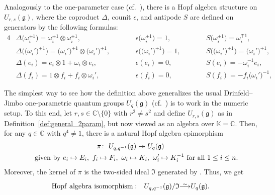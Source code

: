 \documentclass[pdftex]{sigma}
\numberwithin{equation}{section}
\newcommand{\fg}{\mathfrak{g}}
\newcommand{\BC}{\mathbb{C}}
\newcommand\iso{ \vphantom{j^{X^2}}\smash{\overset{\sim}{\vphantom{\rule{0pt}{0.20em}}\smash{\longrightarrow}}} }
\begin{document}
Analogously to the one-parameter case (cf.\ \cite[Section~4.11]{J}), there is a Hopf algebra structure on $U_{r,s}(\fg)$, where the coproduct $\Delta$, counit $\epsilon$, and antipode $S$ are defined on generators by the following formulas:
\begin{alignat*}{4}
 &\Delta\bigl(\omega_{i}^{\pm 1}\bigr) = \omega_{i}^{\pm 1} \otimes \omega_{i}^{\pm 1}, \qquad&&
 \epsilon\bigl(\omega_{i}^{\pm 1}\bigr) = 1, \qquad&&
 S\bigl(\omega_{i}^{\pm 1}\bigr) = \omega_{i}^{\mp 1},& \\
 &\Delta\bigl(\bigl(\omega_{i}'\bigr)^{\pm 1}\bigr) = \bigl(\omega_{i}'\bigr)^{\pm 1} \otimes \bigl(\omega_{i}'\bigr)^{\pm 1},\qquad&&
 \epsilon\bigl(\bigl(\omega_{i}'\bigr)^{\pm 1}\bigr) = 1,\qquad&&
 S\bigl(\bigl(\omega_{i}'\bigr)^{\pm 1}\bigr) = \bigl(\omega_{i}'\bigr)^{\mp 1},& \\
 &\Delta(e_{i}) = e_{i} \otimes 1 + \omega_{i} \otimes e_{i},\qquad&&
 \epsilon(e_{i}) = 0,\qquad&&
 S(e_{i}) = -\omega_{i}^{-1}e_{i} ,&\\
 &\Delta(f_{i}) = 1 \otimes f_{i} + f_{i} \otimes \omega_{i}',\qquad&&
 \epsilon(f_{i}) = 0,\qquad&&
 S(f_{i}) = -f_{i}\bigl(\omega_{i}'\bigr)^{-1},&
\end{alignat*}

\begin{Remark}%
The simplest way to see how the definition above generalizes the usual Drinfeld--Jimbo one-parametric quantum groups $U_q(\fg)$ (cf.\ \cite[Section~4]{J}) is to work in the numeric setup. To this end, let $r,s\in \BC\setminus \{0\}$ with $r^{2}\neq s^{2}$ and define $U_{r,s}(\fg)$ as in Definition~\ref{def:general_2param}, but now viewed as an algebra over $\mathbb{K}=\BC$. Then, for any $q\in \mathbb{C}$ with $q^{4} \neq 1$, there is a natural Hopf algebra epimorphism
\begin{gather*}
 \pi\colon \ U_{q,q^{-1}}(\fg)\twoheadrightarrow U_q(\fg) \\
\hphantom{\pi\colon} \ \mathrm{given\ by} \
 e_{i} \mapsto E_{i},\ f_{i} \mapsto F_{i},\
 \omega_{i} \mapsto K_{i},\ \omega_{i}' \mapsto K_{i}^{-1} \ \mathrm{for\ all} \ 1\leq i\leq n.
\end{gather*}
Moreover, the kernel of $\pi$ is the two-sided ideal $\mathfrak{I}$ generated by . Thus, we get
\[
 \mathrm{Hopf\ algebra\ isomorphism:}\quad U_{q,q^{-1}}(\fg)/\mathfrak{I} \iso U_{q}(\fg).
\]
\end{Remark}
\end{document}
